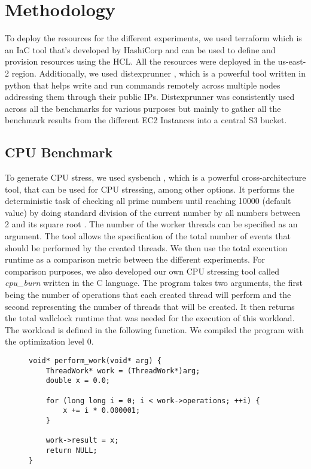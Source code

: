 \chapter{Methodology}\label{chapter:methodology}
To deploy the resources for the different experiments, we used terraform which is an \ac{IaC} tool 
that's developed by HashiCorp and can be used to define and provision resources using the \ac{HCL}. 
All the resources were deployed in the us-east-2 region.
Additionally, we used distexprunner \cite{distex}, which is a powerful tool written in python 
that helps write and run commands remotely across multiple nodes addressing them through their public IPs. 
Distexprunner was consistently used across all the benchmarks for various purposes but mainly
to gather all the benchmark results from the different EC2 Instances into a central S3 bucket.

\section{CPU Benchmark}
To generate CPU stress, we used sysbench \cite{sysbench}, which is a powerful cross-architecture tool, 
that can be used for CPU stressing, among other options. It performs the deterministic task of checking 
all prime numbers until reaching 10000 (default value) by doing standard division of the current number 
by all numbers between 2 and its square root \cite{gentoo_sysbench}. The number of the worker threads can be 
specified as an argument. The tool allows the specification of the total number of events that should 
be performed by the created threads. We then use the total execution runtime as a comparison metric 
between the different experiments. For comparison purposes, 
we also developed our own CPU stressing tool called \textit{cpu\_burn} written in the C language. 
The program takes two arguments, the first being the number of operations that each created thread will 
perform and the second representing the number of threads that will be created. It then returns the 
total wallclock runtime that was needed for the execution of this workload. The workload is defined in
the following function. We compiled the program with the optimization level 0.
\begin{figure}[H]
\begin{lstlisting}[caption={perform\_work function in C}]
void* perform_work(void* arg) {
    ThreadWork* work = (ThreadWork*)arg;
    double x = 0.0;

    for (long long i = 0; i < work->operations; ++i) {
        x += i * 0.000001;
    }

    work->result = x;
    return NULL;
}
\end{lstlisting}
\end{figure}

